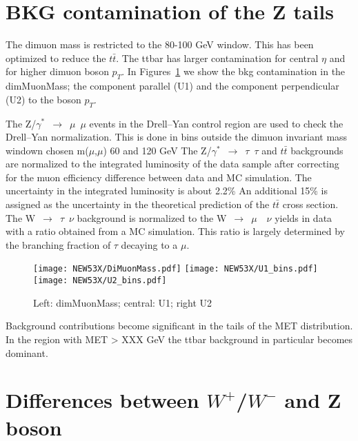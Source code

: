 \documentclass[41pt,a4paper,oneside]{report}
\begin{document}
\section{BKG contamination of the Z tails}
\label{sec:Ztails}
{\color{magenta}{HERE SLIDES:14,15,16}}

The dimuon mass is restricted to the 80-100 GeV window. This has been optimized to reduce the $t\bar{t}$.
The ttbar has larger contamination for central $\eta$ and for higher dimuon boson $p_{T}$.
In Figures~\ref{fig:BKG} we show the bkg contamination in the dimMuonMass; the component parallel (U1) and the component perpendicular (U2) to the boson $p_{T}$.


The Z/$\gamma^{*}$~$\rightarrow$~$\mu$~$\mu$ events in the Drell–Yan control region are used to check the Drell–Yan
normalization. This is done in bins outside the dimuon invariant mass windown chosen m($\mu$,$\mu$) 60 and 120 GeV
The Z/$\gamma^{*}$~$\rightarrow$~$\tau$~$\tau$ and $t\bar{t}$ backgrounds are normalized to the integrated luminosity of the data
sample after correcting for the muon efficiency difference between data and MC simulation.
The uncertainty in the integrated luminosity is about 2.2\%
An additional 15\% is assigned as the uncertainty in the theoretical prediction of the $t\bar{t}$ cross section.
The W~$\rightarrow$~$\tau$~$\nu$ background is normalized to the W~$\rightarrow$~$\mu$~~$\nu$ yields in data with a ratio obtained
from a MC simulation. This ratio is largely determined by the branching fraction of $\tau$ decaying to a $\mu$.

\begin{figure}
  \begin{center}
    \texttt{[image: NEW53X/DiMuonMass.pdf]}
    \texttt{[image: NEW53X/U1\_bins.pdf]}
    \texttt{[image: NEW53X/U2\_bins.pdf]}
    \caption{Left: dimMuonMass; central: U1; right U2}
    \label{fig:BKG}
  \end{center}
\end{figure}


Background contributions become significant in the tails of the MET distribution. In the region with
MET > XXX GeV the ttbar background in particular becomes dominant.


\section{Differences between $W^{+}$/$W^{-}$ and Z boson}
\label{sec:WvsZ}
\end{document}
